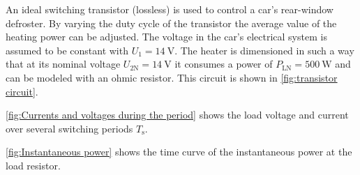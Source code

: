 

An ideal switching transistor (lossless) is used to control a car's rear-window defroster.
By varying the duty cycle of the transistor the average value of the heating power can be adjusted. The voltage in the car's electrical system is assumed to be constant with $U_1 = \SI{14}{\volt}$. The heater is dimensioned in such a way
that at its nominal voltage $ U_{\mathrm{2N}} = \SI{14}{\volt}$ it consumes a power of $ P_{\mathrm{LN}} = \SI{500}{\watt}$ and
can be modeled with an ohmic resistor. This circuit is shown in \autoref{fig:transistor circuit}.

%
\begin{solutionblock}
	\autoref{fig:Currents and voltages during the period} shows the load voltage and current over several switching periods $T_{\mathrm{s}}$.

	

\end{solutionblock}


\begin{solutionblock}
	\autoref{fig:Instantaneous power} shows the time curve of the instantaneous power at the load resistor.

	

\end{solutionblock}



